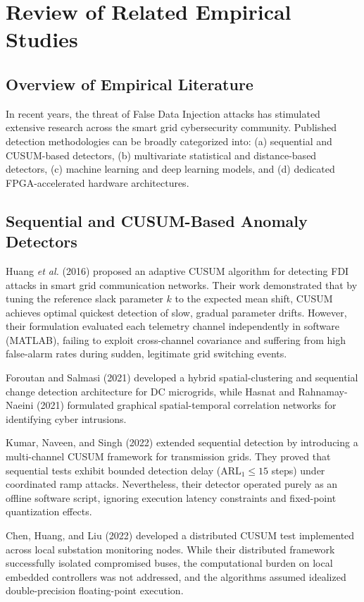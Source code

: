 \documentclass[12pt,a4paper]{report}
\begin{document}
\section{Review of Related Empirical Studies}

\subsection{Overview of Empirical Literature}
In recent years, the threat of False Data Injection attacks has stimulated extensive
research across the smart grid cybersecurity community. Published detection methodologies
can be broadly categorized into: (a) sequential and CUSUM-based detectors, (b) multivariate
statistical and distance-based detectors, (c) machine learning and deep learning models,
and (d) dedicated FPGA-accelerated hardware architectures.

\subsection{Sequential and CUSUM-Based Anomaly Detectors}
Huang \textit{et al.} (2016) \cite{huang2016} proposed an adaptive CUSUM algorithm for
detecting FDI attacks in smart grid communication networks. Their work demonstrated that
by tuning the reference slack parameter $k$ to the expected mean shift, CUSUM achieves
optimal quickest detection of slow, gradual parameter drifts. However, their formulation
evaluated each telemetry channel independently in software (MATLAB), failing to exploit
cross-channel covariance and suffering from high false-alarm rates during sudden, legitimate
grid switching events.

Foroutan and Salmasi (2021) \cite{foroutan2021} developed a hybrid spatial-clustering and sequential change detection architecture for DC microgrids, while Hasnat and Rahnamay-Naeini (2021) \cite{hasnat2021} formulated graphical spatial-temporal correlation networks for identifying cyber intrusions.

Kumar, Naveen, and Singh (2022) \cite{kumar2022} extended sequential detection by introducing
a multi-channel CUSUM framework for transmission grids. They proved that sequential tests
exhibit bounded detection delay ($\text{ARL}_1 \le 15$ steps) under coordinated ramp attacks.
Nevertheless, their detector operated purely as an offline software script, ignoring execution
latency constraints and fixed-point quantization effects.

Chen, Huang, and Liu (2022) \cite{chen2022} developed a distributed CUSUM test implemented
across local substation monitoring nodes. While their distributed framework successfully
isolated compromised buses, the computational burden on local embedded controllers was not
addressed, and the algorithms assumed idealized double-precision floating-point execution.
\end{document}
